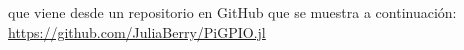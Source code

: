\documentclass[twocolumn, letterpaper,aps,pra,10pt]{revtex4-1}
\begin{document}
que viene desde un repositorio en GitHub que se muestra a continuación:
\\
\url{https://github.com/JuliaBerry/PiGPIO.jl}
\\

\begin{thebibliography}{99}
\end{thebibliography}
\end{document}
